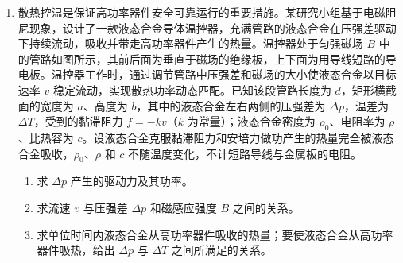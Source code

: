 \documentclass[\gkver]{gaokaozhenti}
\begin{document}
\begin{enumerate}
\item
散热控温是保证高功率器件安全可靠运行的重要措施。某研究小组基于电磁阻尼现象，设计了一款液态合金导体温控器，充满管路的液态合金在压强差驱动下持续流动，吸收并带走高功率器件产生的热量。温控器处于匀强磁场 $B$ 中的管路如图所示，其前后面为垂直于磁场的绝缘板，上下面为用导线短路的导电板。温控器工作时，通过调节管路中压强差和磁场的大小使液态合金以目标速率 $v$ 稳定流动，实现散热功率动态匹配。已知该段管路长度为 $d$，矩形横截面的宽度为 $a$、高度为 $b$，其中的液态合金左右两侧的压强差为 $\Delta p$，温差为 $\Delta T$，受到的黏滞阻力 $f = -kv$（$k$ 为常量）；液态合金密度为 $\rho_{0}$、电阻率为 $\rho$、比热容为 $c$。设液态合金克服黏滞阻力和安培力做功产生的热量完全被液态合金吸收，$\rho_{0}$、$\rho$ 和 $c$ 不随温度变化，不计短路导线与金属板的电阻。
\begin{enumerate}
	\item
	求 $\Delta p$ 产生的驱动力及其功率。
	\item
	求流速 $v$ 与压强差 $\Delta p$ 和磁感应强度 $B$ 之间的关系。
	\item
	求单位时间内液态合金从高功率器件吸收的热量；要使液态合金从高功率器件吸热，给出 $\Delta p$ 与 $\Delta T$ 之间所满足的关系。
\end{enumerate}
\onepicture[w=6.5cm, align=right]{}

\end{enumerate}
\end{document}
